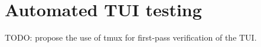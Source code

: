 \section{Automated TUI testing}
TODO: propose the use of tmux for first-pass verification of the TUI.
